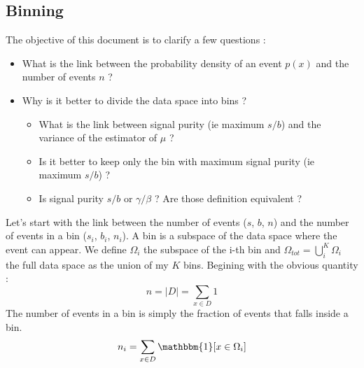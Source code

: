 \subsection{Binning} %
\label{sub:binning}

The objective of this document is to clarify a few questions :
\begin{itemize}
	\item What is the link between the probability density of an event $p(x)$ and the number of events $n$ ?
	\item Why is it better to divide the data space into bins ?
	\begin{itemize}
		\item What is the link between signal purity (ie maximum $s/b$) and the variance of the estimator of $\mu$ ?
		\item Is it better to keep only the bin with maximum signal purity (ie maximum $s/b$) ?
		\item Is signal purity $s/b$ or $\gamma / \beta$ ? Are those definition equivalent ?
	\end{itemize}
\end{itemize}



Let's start with the link between the number of events ($s$, $b$, $n$) and the number of events in a bin ($s_i$, $b_i$, $n_i$).
A bin is a subspace of the data space where the event can appear.
We define $\Omega_i$ the subspace of the i-th bin and $\Omega_{tot} = \bigcup_i^K \Omega_i $ the full data space as the union of my $K$ bins.
Begining with the obvious quantity :
\begin{equation}
	n = |D| = \sum_{x\in D} 1
\end{equation}
The number of events in a bin is simply the fraction of events that falls inside a bin.
\begin{equation}
	n_i = \sum_{x\in D} \mathbbm{1} [x\in \Omega_i]
\end{equation}



